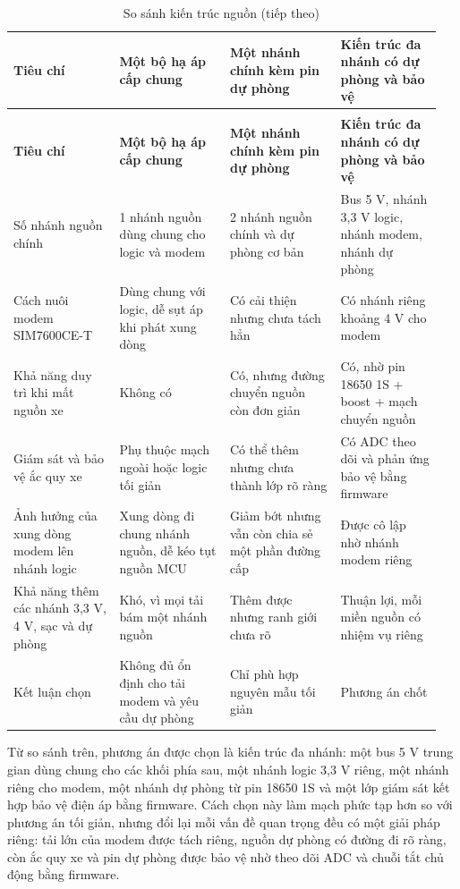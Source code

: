\documentclass[a4paper]{extarticle}
\newcommand{\thesissettableid}[2]{%
  \renewcommand{\thetable}{#1}%
  \renewcommand{\theHtable}{#2}%
}
\begin{document}
{\thesissettableid{3.11}{condensed-bang-3-11-so-sanh-kien-truc-nguon}
\def\LTcaptype{table}
\begin{longtable}{|L{0.239\linewidth}|L{0.247\linewidth}|L{0.243\linewidth}|L{0.223\linewidth}|}
\caption{So sánh kiến trúc nguồn}\label{tab:condensed-bang-3-11-so-sanh-kien-truc-nguon}\\
\hline
\textbf{Tiêu chí} & \textbf{Một bộ hạ áp cấp chung} & \textbf{Một nhánh chính kèm pin dự phòng} & \textbf{Kiến trúc đa nhánh có dự phòng và bảo vệ} \\
\hline
\endfirsthead
\caption[]{So sánh kiến trúc nguồn (tiếp theo)}\\
\hline
\textbf{Tiêu chí} & \textbf{Một bộ hạ áp cấp chung} & \textbf{Một nhánh chính kèm pin dự phòng} & \textbf{Kiến trúc đa nhánh có dự phòng và bảo vệ} \\
\hline
\endhead
\endfoot
\endlastfoot
Số nhánh nguồn chính & 1 nhánh nguồn dùng chung cho logic và modem & 2 nhánh nguồn chính và dự phòng cơ bản & Bus 5 V, nhánh 3,3 V logic, nhánh modem, nhánh dự phòng \\\hline
Cách nuôi modem SIM7600CE-T & Dùng chung với logic, dễ sụt áp khi phát xung dòng & Có cải thiện nhưng chưa tách hẳn & Có nhánh riêng khoảng 4 V cho modem \\\hline
Khả năng duy trì khi mất nguồn xe & Không có & Có, nhưng đường chuyển nguồn còn đơn giản & Có, nhờ pin 18650 1S + boost + mạch chuyển nguồn \\\hline
Giám sát và bảo vệ ắc quy xe & Phụ thuộc mạch ngoài hoặc logic tối giản & Có thể thêm nhưng chưa thành lớp rõ ràng & Có ADC theo dõi và phản ứng bảo vệ bằng firmware \\\hline
Ảnh hưởng của xung dòng modem lên nhánh logic & Xung dòng đi chung nhánh nguồn, dễ kéo tụt nguồn MCU & Giảm bớt nhưng vẫn còn chia sẻ một phần đường cấp & Được cô lập nhờ nhánh modem riêng \\\hline
Khả năng thêm các nhánh 3,3 V, 4 V, sạc và dự phòng & Khó, vì mọi tải bám một nhánh nguồn & Thêm được nhưng ranh giới chưa rõ & Thuận lợi, mỗi miền nguồn có nhiệm vụ riêng \\\hline
Kết luận chọn & Không đủ ổn định cho tải modem và yêu cầu dự phòng & Chỉ phù hợp nguyên mẫu tối giản & Phương án chốt \\\hline
\end{longtable}
}

Từ so sánh trên, phương án được chọn là kiến trúc đa nhánh: một bus 5 V
trung gian dùng chung cho các khối phía sau, một nhánh logic 3,3 V riêng,
một nhánh riêng cho modem, một nhánh dự phòng từ pin 18650 1S và một lớp
giám sát kết hợp bảo vệ điện áp bằng firmware. Cách chọn này làm mạch phức
tạp hơn so với phương án tối giản, nhưng đổi lại mỗi vấn đề quan trọng đều
có một giải pháp riêng: tải lớn của modem được tách riêng, nguồn dự phòng
có đường đi rõ ràng, còn ắc quy xe và pin dự phòng được bảo vệ nhờ theo
dõi ADC và chuỗi tắt chủ động bằng firmware.
\end{document}
